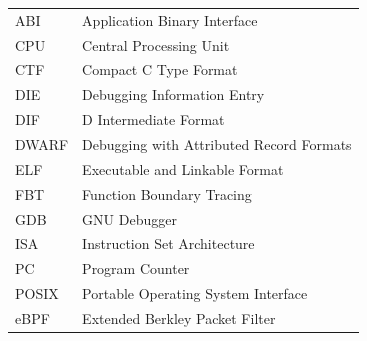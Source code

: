 \documentclass[12pt]{article}
\begin{document}
\begin{tabular}{ll}
	ABI & Application Binary Interface \\
	CPU & Central Processing Unit \\
	CTF & Compact C Type Format \\
	DIE & Debugging Information Entry \\
	DIF & D Intermediate Format \\
	DWARF & Debugging with Attributed Record Formats \\
	ELF & Executable and Linkable Format \\
	FBT & Function Boundary Tracing \\
	GDB & GNU Debugger \\
	ISA & Instruction Set Architecture \\
	PC & Program Counter \\
	POSIX & Portable Operating System Interface \\
	eBPF & Extended Berkley Packet Filter \\
\end{tabular}
\end{document}
